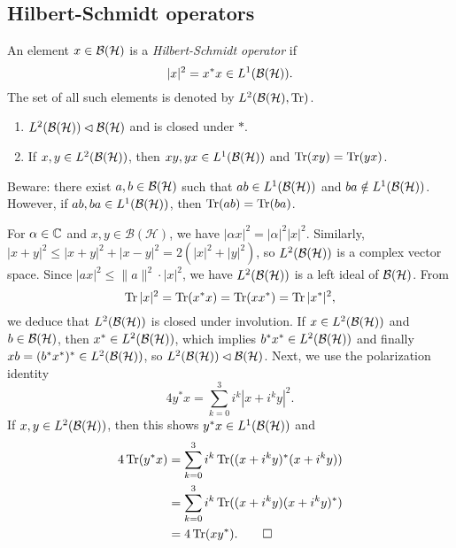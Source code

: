 \subsection{Hilbert-Schmidt operators}

\begin{definition}
  An element $x \in \bh$ is a \emph{Hilbert-Schmidt operator} 
  if $$|x|^2 = x^* x \in L^1 (\bh).$$
  The set of all such elements is denoted by $L^2 (\bh, \trace)$. 
\end{definition}

\begin{proposition}
  \begin{enumerate}
    \item $L^2 (\bh) \lhd \bh$ and is closed under $*$.
    \item If $x, y \in L^2 (\bh)$, then $xy, yx \in L^1 (\bh)$ and $\trace(xy) = \trace (yx)$.
  \end{enumerate}
\end{proposition}

\begin{remark}
  Beware: there exist $a, b \in \bh$ such that $ab \in L^1 (\bh)$
  and $ba \notin L^1 (\bh)$. However, if $ab, ba \in L^1 (\bh)$,
  then $\trace (ab) = \trace (ba)$.
\end{remark}

\begin{myproof}
  For $\alpha \in \C$ and $x, y \in \mathcal{B}(\mathcal{H})$, we have $|\alpha x|^2 = |\alpha|^2 |x|^2$.
  Similarly, $|x + y|^2 \leq |x + y|^2 + |x - y|^2 = 2 (|x|^2 + |y|^2)$, so $L^2 (\bh)$ is a complex vector space.
  Since $|ax|^2 \leq \| a\|^2 \cdot |x|^2$, we have $L^2 (\bh)$ is a left ideal of $\bh$.
  From 
  $$\trace |x|^2 = \trace (x^* x) = \trace (x x^*) = \trace |x^* |^2,$$
  we deduce that $L^2 (\bh)$ is closed under involution.
  If $x \in L^2 (\bh)$ and $b \in \bh$,
  then $x^* \in L^2 (\bh)$, which implies $b^* x^* \in L^2 (\bh)$ and finally $xb = (b^* x^*)^* \in L^2 (\bh)$,
  so $L^2 (\bh) \lhd \bh$.
  Next, we use the polarization identity 
  $$4 y^* x = \sum_{k = 0} ^3 i^k |x + i^k y|^2.$$
  If $x, y \in L^2 (\bh)$, then this shows $y^* x \in L^1 (\bh)$
  and 
  \begin{align*}
    4 \trace (y^* x) &= \sum_{k = 0} ^3 i^k \trace ((x + i^k y)^*(x + i^k y))\\
    &= \sum_{k = 0} ^3 i^k \trace ((x + i^k y)(x + i^k y)^*)\\
    &= 4 \trace (x y^*). \qedhere
  \end{align*}
\end{myproof}

